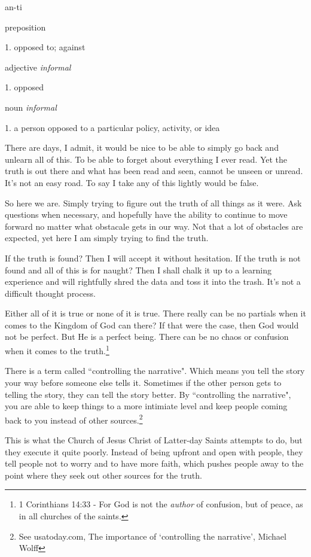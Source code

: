 \begin{displayquote}
an-ti

preposition

1. opposed to; against

adjective \textit{informal}

1. opposed

noun \textit{informal}

1. a person opposed to a particular policy, activity, or idea
\end{displayquote}

There are days, I admit, it would be nice to be able to simply go back and
unlearn all of this. To be able to forget about everything I ever read. Yet the
truth is out there and what has been read and seen, cannot be unseen or unread.
It's not an easy road. To say I take any of this lightly would be false.

So here we are. Simply trying to figure out the truth of all things as it were.
Ask questions when necessary, and hopefully have the ability to continue to move
forward no matter what obstacale gets in our way. Not that a lot of obstacles
are expected, yet here I am simply trying to find the truth.

If the truth is found? Then I will accept it without hesitation. If the truth is
not found and all of this is for naught? Then I shall chalk it up to a learning
experience and will rightfully shred the data and toss it into the trash. It's
not a difficult thought process.

Either all of it is true or none of it is true. There really can be no partials
when it comes to the Kingdom of God can there? If that were the case, then God
would not be perfect. But He is a perfect being. There can be no chaos or
confusion when it comes to the truth.\footnote{1 Corinthians 14:33 - For God is 
not the \textit{author} of confusion, but of peace, as in all churches of 
the saints.}

There is a term called ``controlling the narrative". Which means you tell the
story your way before someone else tells it. Sometimes if the other person gets
to telling the story, they can tell the story better. By ``controlling the
narrative",  you are able to keep things to a more intimiate level and keep
people coming back to you instead of other sources.\footnote{See usatoday.com, 
The importance of `controlling the narrative', Michael Wolff}

This is what the Church of Jesus Christ of Latter-day Saints attempts to do, but
they execute it quite poorly. Instead of being upfront and open with people,
they tell people not to worry and to have more faith, which pushes people away
to the point where they seek out other sources for the truth.

